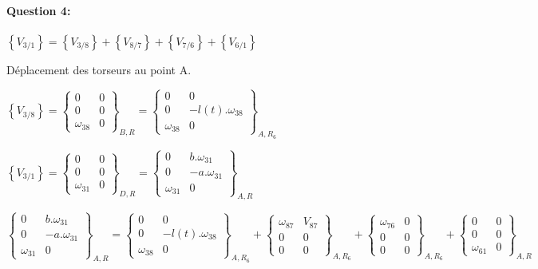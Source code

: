 \paragraph{Question 4:}

\begin{math}
\left\{V_{3/1}\right\}=\left\{V_{3/8}\right\}+\left\{V_{8/7}\right\}+\left\{V_{7/6}\right\}+\left\{V_{6/1}\right\}
\end{math}

Déplacement des torseurs au point A.

$\left\{V_{3/8}\right\}=
\left\{\begin{array}{cc}
0 & 0 \\
0 & 0 \\
\omega_{38} & 0
\end{array}\right\}_{B,R}=
\left\{\begin{array}{cc}
0 & 0 \\
0 & -l(t).\omega_{38} \\
\omega_{38} & 0
\end{array}\right\}_{A,R_6}$

$\left\{V_{3/1}\right\}=
\left\{\begin{array}{cc}
0 & 0 \\
0 & 0 \\
\omega_{31} & 0
\end{array}\right\}_{D,R}=
\left\{\begin{array}{cc}
0 & b.\omega_{31} \\
0 & -a.\omega_{31} \\
\omega_{31} & 0
\end{array}\right\}_{A,R}$


\begin{math}
\left\{\begin{array}{cc}
0 & b.\omega_{31} \\
0 & -a.\omega_{31} \\
\omega_{31} & 0
\end{array}\right\}_{A,R}=
\left\{\begin{array}{cc}
0 & 0 \\
0 & -l(t).\omega_{38} \\
\omega_{38} & 0
\end{array}\right\}_{A,R_6}+
\left\{\begin{array}{cc}
\omega_{87} & V_{87} \\
0 & 0 \\
0 & 0
\end{array}\right\}_{A,R_6}+
\left\{\begin{array}{cc}
\omega_{76} & 0 \\
0 & 0 \\
0 & 0
\end{array}\right\}_{A,R_6}+
\left\{\begin{array}{cc}
0 & 0 \\
0 & 0 \\
\omega_{61} & 0
\end{array}\right\}_{A,R}
\end{math}

